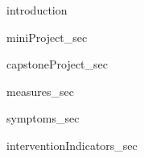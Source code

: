 {introduction}

{miniProject_sec}

{capstoneProject_sec}

{measures_sec}

{symptoms_sec}

{interventionIndicators_sec}